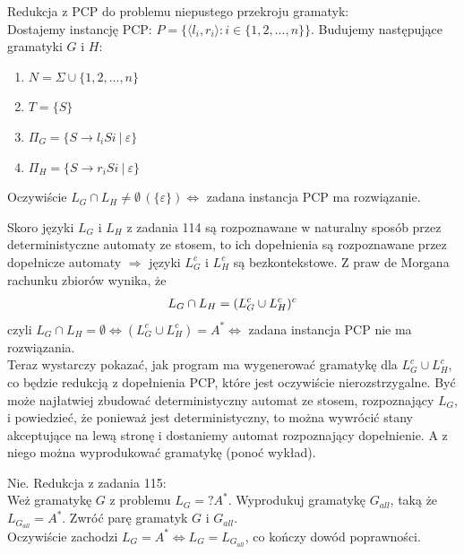 \documentclass[a4paper,11pt]{article}
\newenvironment{zadanie}[1]
  {\renewcommand\theinnercustomthm{#1}\innercustomthm}
  {\endinnercustomthm}
\begin{document}
\begin{zadanie}{114}
\end{zadanie}
Redukcja z PCP do problemu niepustego przekroju gramatyk: \\
Dostajemy instancję PCP: $P = \{ \langle l_i, r_i \rangle : i \in \{ 1,2,...,n \} \}$. Budujemy następujące gramatyki $G$ i $H$: \\
\begin{enumerate}
 \item $N = \Sigma \cup \{1,2,...,n\}$
 \item $T = \{ S \}$
 \item $\Pi_G = \{ S \longrightarrow l_i S i \ | \ \varepsilon \}$
 \item $\Pi_H = \{ S \longrightarrow r_i S i \ | \ \varepsilon \}$
\end{enumerate}
Oczywiście $L_G \cap L_H \neq \emptyset \, (\{ \varepsilon \}) \Longleftrightarrow $ zadana instancja PCP ma rozwiązanie.

\begin{zadanie}{115}
\end{zadanie}
Skoro języki $L_G$ i $L_H$ z zadania 114 są rozpoznawane w naturalny sposób przez deterministyczne automaty ze stosem,
to ich dopełnienia są rozpoznawane przez dopełnicze automaty $\Rightarrow$ języki $L_G^c$ i $L_H^c$ są bezkontekstowe. 
Z praw de Morgana rachunku zbiorów wynika, że
\begin{align}
 L_G \cap L_H = (L_G^c \cup L_H^c)^c \notag
\end{align}
czyli $L_G \cap L_H = \emptyset  \Longleftrightarrow (L_G^c \cup L_H^c) = A^* \Longleftrightarrow $ zadana instancja PCP 
nie ma rozwiązania. \\
Teraz wystarczy pokazać, jak program ma wygenerować gramatykę dla $L_G^c \cup L_H^c$, co będzie redukcją z dopełnienia PCP,
które jest oczywiście nierozstrzygalne. Być może najłatwiej zbudować deterministyczny automat ze stosem, rozpoznający $L_G$,
i powiedzieć, że ponieważ jest deterministyczny, to można wywrócić stany akceptujące na lewą stronę i dostaniemy automat rozpoznający
dopełnienie. A z niego można wyprodukować gramatykę (ponoć wykład).

\begin{zadanie}{116}
\end{zadanie}
Nie. Redukcja z zadania 115: \\
Weż gramatykę $G$ z problemu $L_G =? A^*$. Wyprodukuj gramatykę $G_{all}$, taką że $L_{G_{all}} = A^*$. Zwróć parę gramatyk
$G$ i $G_{all}$. \\
Oczywiście zachodzi $L_G = A^* \Longleftrightarrow L_G = L_{G_{all}}$, co kończy dowód poprawności.
\end{document}
